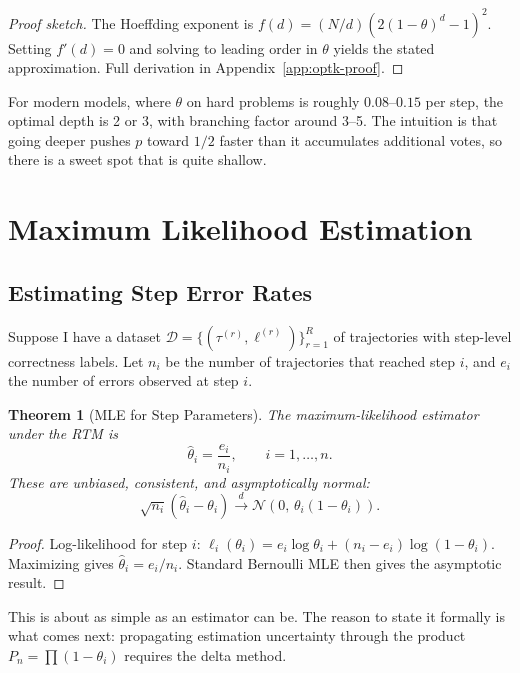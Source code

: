 \documentclass[11pt]{article}
\theoremstyle{plain}
\newtheorem{theorem}{Theorem}[section]
\theoremstyle{definition}
\begin{document}
\begin{proof}[Proof sketch]
  The Hoeffding exponent is $f(d) = (N/d)(2(1-\theta)^d-1)^2$. Setting $f'(d)=0$
  and solving to leading order in $\theta$ yields the stated approximation.
  Full derivation in Appendix~\ref{app:optk-proof}.
\end{proof}

For modern models, where $\theta$ on hard problems is roughly $0.08$--$0.15$ per
step, the optimal depth is 2 or 3, with branching factor around 3--5. The
intuition is that going deeper pushes $p$ toward $1/2$ faster than it
accumulates additional votes, so there is a sweet spot that is quite shallow.

\section{Maximum Likelihood Estimation}
\label{sec:mle}

\subsection{Estimating Step Error Rates}

Suppose I have a dataset $\mathcal{D} = \{(\tau^{(r)}, \ell^{(r)})\}_{r=1}^R$
of trajectories with step-level correctness labels. Let $n_i$ be the number of
trajectories that reached step $i$, and $e_i$ the number of errors observed
at step $i$.

\begin{theorem}[MLE for Step Parameters]\label{thm:mle}
  The maximum-likelihood estimator under the RTM is
  \[
    \hat\theta_i = \frac{e_i}{n_i}, \qquad i = 1,\ldots,n.
  \]
  These are unbiased, consistent, and asymptotically normal:
  \[
    \sqrt{n_i}(\hat\theta_i - \theta_i) \xrightarrow{d} \mathcal{N}(0,\,\theta_i(1-\theta_i)).
  \]
\end{theorem}

\begin{proof}
  Log-likelihood for step $i$:
  $\ell_i(\theta_i) = e_i\log\theta_i + (n_i-e_i)\log(1-\theta_i)$.
  Maximizing gives $\hat\theta_i = e_i/n_i$. Standard Bernoulli MLE then
  gives the asymptotic result.
\end{proof}

This is about as simple as an estimator can be. The reason to state it
formally is what comes next: propagating estimation uncertainty through the
product $P_n = \prod(1-\theta_i)$ requires the delta method.
\end{document}

